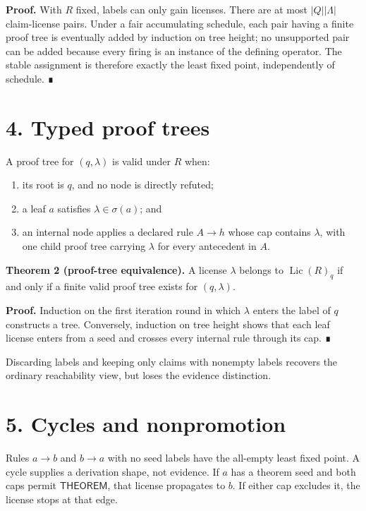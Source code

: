 \documentclass[
  11pt,
]{article}
\providecommand{\tightlist}{%
  \setlength{\itemsep}{0pt}\setlength{\parskip}{0pt}}
\begin{document}
\textbf{Proof.} With \(R\) fixed, labels can only gain licenses. There
are at most \(|Q||\Lambda|\) claim-license pairs. Under a fair
accumulating schedule, each pair having a finite proof tree is
eventually added by induction on tree height; no unsupported pair can be
added because every firing is an instance of the defining operator. The
stable assignment is therefore exactly the least fixed point,
independently of schedule. ∎

\hypertarget{typed-proof-trees}{%
\section{4. Typed proof trees}\label{typed-proof-trees}}

A proof tree for \((q, \lambda)\) is valid under \(R\) when:

\begin{enumerate}
\def\labelenumi{\arabic{enumi}.}
\tightlist
\item
  its root is \(q\), and no node is directly refuted;
\item
  a leaf \(a\) satisfies \(\lambda\in\sigma(a)\); and
\item
  an internal node applies a declared rule \(A\to h\) whose cap contains
  \(\lambda\), with one child proof tree carrying \(\lambda\) for every
  antecedent in \(A\).
\end{enumerate}

\textbf{Theorem 2 (proof-tree equivalence).} A license \(\lambda\)
belongs to \(\operatorname{Lic}(R)_q\) if and only if a finite valid
proof tree exists for \((q, \lambda)\).

\textbf{Proof.} Induction on the first iteration round in which
\(\lambda\) enters the label of \(q\) constructs a tree. Conversely,
induction on tree height shows that each leaf license enters from a seed
and crosses every internal rule through its cap. ∎

Discarding labels and keeping only claims with nonempty labels recovers
the ordinary reachability view, but loses the evidence distinction.

\hypertarget{cycles-and-nonpromotion}{%
\section{5. Cycles and nonpromotion}\label{cycles-and-nonpromotion}}

Rules \(a\to b\) and \(b\to a\) with no seed labels have the all-empty
least fixed point. A cycle supplies a derivation shape, not evidence. If
\(a\) has a theorem seed and both caps permit \(\textsf{THEOREM}\), that
license propagates to \(b\). If either cap excludes it, the license
stops at that edge.
\end{document}
